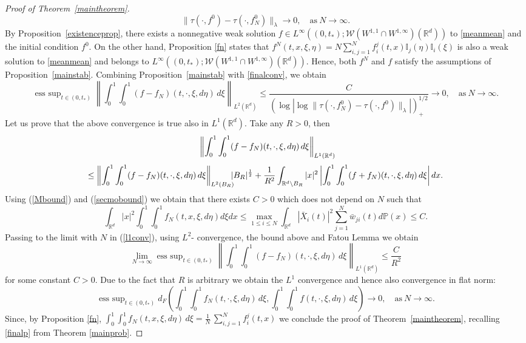 \documentclass[10pt]{article}
\DeclareMathOperator*{\esssup}{ess~sup}
\newcommand{\eqq}[2]{\begin{equation}  #1  \label{#2}\end{equation}    }
\newcommand*{\abs}[1]{\left\vert{#1}\right\vert}
\newcommand{\R}{\mathbb{R}}
\newcommand{\izj}{\int_{0}^{1}}
\newcommand{\ird}{\int_{\mathbb{R}^d}}
\newcommand{\xb}{\bar{X}}
\newcommand{\p}{\mathbb{P}}
\newcommand{\wjib}{\bar{w}_{ji}}
\newcommand{\fji}{f^j_i}
\newcommand{\W}{\mathcal{W}}
\begin{document}
\begin{proof}[Proof of Theorem~\ref{maintheorem}]
\begin{equation}
\|\tau(\cdot,f^0)-\tau(\cdot,f^0_N)\|_{\lambda}\to 0,\quad\mbox{as}\ N\to\infty.\label{finalconv}
  \end{equation}
By Proposition~\ref{existenceprop}, there exists a nonnegative weak solution $f\in L^\infty((0,t_*);\W( W^{1,1}\cap W^{1,\infty})(\R^d))$ to \eqref{meanmean}  and the initial condition $f^0$. On the other hand, Proposition \ref{fn} states that $f^N(t,x,\xi,\eta)=N\sum_{i,j=1}^N \fji(t,x)\mathbb{I}_{j}(\eta) \mathbb{I}_{i}(\xi)$ is also a weak solution to \eqref{meanmean}  and belongs to $L^\infty((0,t_*);\W( W^{1,1}\cap W^{1,\infty})(\R^d))$. Hence, both $f^N$ and $f$ satisfy the assumptions of Proposition~\ref{mainstab}. Combining Proposition~\ref{mainstab} with \eqref{finalconv}, we obtain
\[
\esssup_{t \in (0,t_{*})}\left\|\int_0^1\int_0^1 (f-f_N)(t,\cdot,\xi,d\eta)\,d\xi\right\|_{L^2(\R^d)}\leq \frac{C}{{(\log |\log \|\tau(\cdot,f^0_N)-\tau(\cdot,f^0)\|_{\lambda}|)^{1/2}_+}}\to 0,\quad \mbox{as}\ N\to \infty.
\]
Let us prove that the above convergence is true also in $L^1(\R^d)$. Take  any $R>0$, then
\[
\left\|\int_0^1\int_0^1 (f-f_N)(t,\cdot,\xi,d\eta)\,d\xi\right\|_{L^1(\R^d)}\hspace{-0.2cm}
\]
\eqq{
\leq \left\|\int_0^1 \int_0^1 (f-f_N)(t,\cdot,\xi,d\eta)\,d\xi\right\|_{L^2(B_{R})} \hspace{-0.2cm}|B_{R}|^{\frac{1}{2}} + \frac{1}{R^2}\int_{\R^d \setminus B_R}|x|^2 \abs{\int_0^1 \int_0^1 (f+f_N)(t,\cdot,\xi,d\eta)\,d\xi}dx.  
}{l1conv}
Using (\ref{Mbound}) and  (\ref{secmobound}) we obtain that there exists $C>0$ which does not depend on $N$ such that
\[
\ird |x|^2 \izj \izj f_N(t,x,\xi,d\eta)d\xi dx \leq \max_{1\leq i \leq N}\ird |\xb_i(t)|^2 \sum_{j=1}^N\wjib(t)d\p(x) \leq C.
\]
Passing to the limit with $N$ in (\ref{l1conv}), using $L^2$- convergence, the bound above and Fatou Lemma 
 we obtain
\[
\lim_{N\rightarrow \infty}\esssup_{t \in (0,t_{*})}\left\|\int_0^1 \int_0^1 (f-f_N)(t,\cdot,\xi,d\eta)\,d\xi\right\|_{L^1(\R^d)} \leq \frac{C}{R^2}
\]
for some constant $C>0$. Due to the fact that $R$ is arbitrary we obtain the $L^1$ convergence and hence also convergence in flat norm: 
\[
\esssup_{t \in (0,t_{*})}d_F\left(\int_0^1 \int_0^1 f_N(t,\cdot,\xi,d\eta)\,d\xi,\int_0^1 \int_0^1 f(t,\cdot,\xi,d\eta)\,d\xi\right)\to 0,\quad \mbox{as}\ N\to \infty.
\]
Since, by Proposition \ref{fn},  $\int_0^1 \int_0^1 f_N(t,x,\xi,d\eta)\,d\xi=\frac{1}{N}\,\sum_{i,j=1}^N  f_i^j(t,x)$ we conclude the proof of Theorem~\ref{maintheorem}, recalling \eqref{finalp} from Theorem \ref{mainprob}. 
\end{proof}
\end{document}
